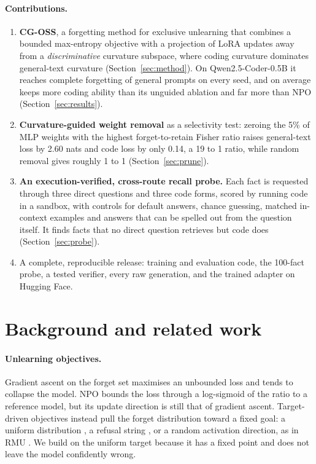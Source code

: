 \documentclass{article}
\begin{document}
\paragraph{Contributions.}
\begin{enumerate}
\item \textbf{CG-OSS}, a forgetting method for exclusive unlearning that combines a bounded max-entropy objective with a projection of LoRA updates away from a \emph{discriminative} curvature subspace, where coding curvature dominates general-text curvature (Section~\ref{sec:method}). On Qwen2.5-Coder-0.5B it reaches complete forgetting of general prompts on every seed, and on average keeps more coding ability than its unguided ablation and far more than NPO (Section~\ref{sec:results}).
\item \textbf{Curvature-guided weight removal} as a selectivity test: zeroing the 5\% of MLP weights with the highest forget-to-retain Fisher ratio raises general-text loss by 2.60 nats and code loss by only 0.14, a 19 to 1 ratio, while random removal gives roughly 1 to 1 (Section~\ref{sec:prune}).
\item \textbf{An execution-verified, cross-route recall probe.} Each fact is requested through three direct questions and three code forms, scored by running code in a sandbox, with controls for default answers, chance guessing, matched in-context examples and answers that can be spelled out from the question itself. It finds facts that no direct question retrieves but code does (Section~\ref{sec:probe}).
\item A complete, reproducible release: training and evaluation code, the 100-fact probe, a tested verifier, every raw generation, and the trained adapter on Hugging Face.
\end{enumerate}

\section{Background and related work}
\label{sec:related}

\paragraph{Unlearning objectives.}
Gradient ascent on the forget set \citep{jang2023knowledge,yao2023llm_unlearning} maximises an unbounded loss and tends to collapse the model. NPO \citep{zhang2024npo} bounds the loss through a log-sigmoid of the ratio to a reference model, but its update direction is still that of gradient ascent. Target-driven objectives instead pull the forget distribution toward a fixed goal: a uniform distribution \citep{chundawat2023badteacher}, a refusal string \citep{eldan2023whos,maini2024tofu}, or a random activation direction, as in RMU \citep{li2024wmdp_rmu}. We build on the uniform target because it has a fixed point and does not leave the model confidently wrong.
\end{document}
